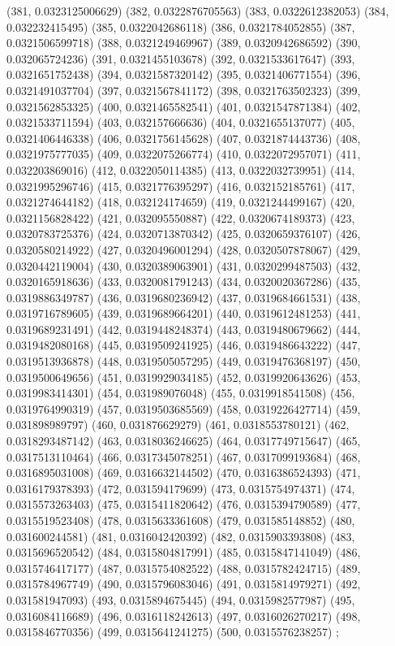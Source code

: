 {					(381, 0.0323125006629)
					(382, 0.0322876705563)
					(383, 0.0322612382053)
					(384, 0.032232415495)
					(385, 0.0322042686118)
					(386, 0.0321784052855)
					(387, 0.0321506599718)
					(388, 0.0321249469967)
					(389, 0.0320942686592)
					(390, 0.032065724236)
					(391, 0.0321455103678)
					(392, 0.0321533617647)
					(393, 0.0321651752438)
					(394, 0.0321587320142)
					(395, 0.0321406771554)
					(396, 0.0321491037704)
					(397, 0.0321567841172)
					(398, 0.0321763502323)
					(399, 0.0321562853325)
					(400, 0.0321465582541)
					(401, 0.0321547871384)
					(402, 0.0321533711594)
					(403, 0.032157666636)
					(404, 0.0321655137077)
					(405, 0.0321406446338)
					(406, 0.0321756145628)
					(407, 0.0321874443736)
					(408, 0.0321975777035)
					(409, 0.0322075266774)
					(410, 0.0322072957071)
					(411, 0.032203869016)
					(412, 0.0322050114385)
					(413, 0.0322032739951)
					(414, 0.0321995296746)
					(415, 0.0321776395297)
					(416, 0.032152185761)
					(417, 0.0321274644182)
					(418, 0.032124174659)
					(419, 0.0321244499167)
					(420, 0.0321156828422)
					(421, 0.032095550887)
					(422, 0.0320674189373)
					(423, 0.0320783725376)
					(424, 0.0320713870342)
					(425, 0.0320659376107)
					(426, 0.0320580214922)
					(427, 0.0320496001294)
					(428, 0.0320507878067)
					(429, 0.0320442119004)
					(430, 0.0320389063901)
					(431, 0.0320299487503)
					(432, 0.0320165918636)
					(433, 0.0320081791243)
					(434, 0.0320020367286)
					(435, 0.0319886349787)
					(436, 0.0319680236942)
					(437, 0.0319684661531)
					(438, 0.0319716789605)
					(439, 0.0319689664201)
					(440, 0.0319612481253)
					(441, 0.0319689231491)
					(442, 0.0319448248374)
					(443, 0.0319480679662)
					(444, 0.0319482080168)
					(445, 0.0319509241925)
					(446, 0.0319486643222)
					(447, 0.0319513936878)
					(448, 0.0319505057295)
					(449, 0.0319476368197)
					(450, 0.0319500649656)
					(451, 0.0319929034185)
					(452, 0.0319920643626)
					(453, 0.0319983414301)
					(454, 0.031989076048)
					(455, 0.0319918541508)
					(456, 0.0319764990319)
					(457, 0.0319503685569)
					(458, 0.0319226427714)
					(459, 0.031898989797)
					(460, 0.031876629279)
					(461, 0.0318553780121)
					(462, 0.0318293487142)
					(463, 0.0318036246625)
					(464, 0.0317749715647)
					(465, 0.0317513110464)
					(466, 0.0317345078251)
					(467, 0.0317099193684)
					(468, 0.0316895031008)
					(469, 0.0316632144502)
					(470, 0.0316386524393)
					(471, 0.0316179378393)
					(472, 0.031594179699)
					(473, 0.0315754974371)
					(474, 0.0315573263403)
					(475, 0.0315411820642)
					(476, 0.0315394790589)
					(477, 0.0315519523408)
					(478, 0.0315633361608)
					(479, 0.031585148852)
					(480, 0.031600244581)
					(481, 0.0316042420392)
					(482, 0.0315903393808)
					(483, 0.0315696520542)
					(484, 0.0315804817991)
					(485, 0.0315847141049)
					(486, 0.0315746417177)
					(487, 0.0315754082522)
					(488, 0.0315782424715)
					(489, 0.0315784967749)
					(490, 0.0315796083046)
					(491, 0.0315814979271)
					(492, 0.031581947093)
					(493, 0.0315894675445)
					(494, 0.0315982577987)
					(495, 0.0316084116689)
					(496, 0.0316118242613)
					(497, 0.0316026270217)
					(498, 0.0315846770356)
					(499, 0.0315641241275)
					(500, 0.0315576238257)
				};
